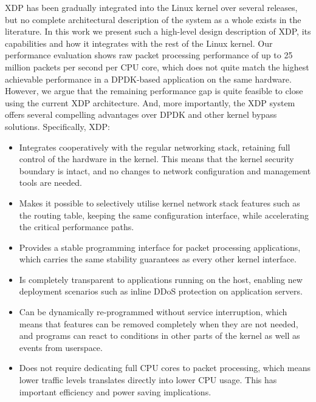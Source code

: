 \documentclass[10pt,sigconf]{acmart}
\begin{document}
XDP has been gradually integrated into the Linux kernel over several releases,
but no complete architectural description of the system as a whole exists in the
literature. In this work we present such a high-level design description of XDP,
its capabilities and how it integrates with the rest of the Linux kernel. Our
performance evaluation shows raw packet processing performance of up to 25
million packets per second per CPU core, which does not quite match the highest
achievable performance in a DPDK-based application on the same hardware.
However, we argue that the remaining performance gap is quite feasible to close
using the current XDP architecture. And, more importantly, the XDP system offers
several compelling advantages over DPDK and other kernel bypass solutions.
Specifically, XDP:

\begin{itemize}
\item Integrates cooperatively with the regular networking stack, retaining full
  control of the hardware in the kernel. This means that the kernel security
  boundary is intact, and no changes to network configuration and management
  tools are needed.

\item Makes it possible to selectively utilise kernel network stack features
  such as the routing table, keeping the same configuration interface, while
  accelerating the critical performance paths.

\item Provides a stable programming interface for packet processing
  applications, which carries the same stability guarantees as every other
  kernel interface.

\item Is completely transparent to applications running on the host, enabling
  new deployment scenarios such as inline DDoS protection on application
  servers.

\item Can be dynamically re-programmed without service interruption, which means
  that features can be removed completely when they are not needed, and programs
  can react to conditions in other parts of the kernel as well as events from
  userspace.

\item Does not require dedicating full CPU cores to packet processing, which
  means lower traffic levels translates directly into lower CPU usage. This has
  important efficiency and power saving implications.
\end{itemize}
\end{document}
